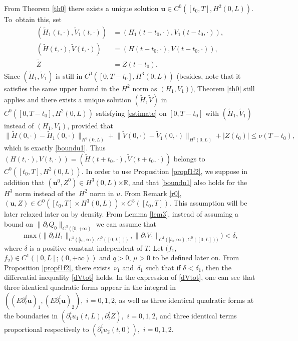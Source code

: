 \documentclass[JEP,XML,SOM,Unicode]{cedram}
\theoremstyle{definition}
\begin{document}
From Theorem \ref{th0} there exists a unique solution $\boldsymbol{u}\in C^{0}([{t_{0}},T],H^{2}(0,L))$.
To~obtain this, set
\begin{align*}
(\widetilde{H}_{1}(t,\cdot), \widetilde{V}_{1}(t,\cdot)) &= (H_{1}(t-t_{0},\cdot), V_{1}(t-t_{0},\cdot)), \\
(\widetilde{H}(t,\cdot), \widetilde{V}(t,\cdot)) &= (H(t-t_{0},\cdot), V(t-t_{0},\cdot)),\\
\widetilde{Z} &= Z(t-t_{0}). 
\end{align*}
Since $(\widetilde{H}_{1}, \widetilde{V}_{1})$ is still in $C^{0}([0,T-t_{0}], H^{3}(0,L))$ (besides, note that it satisfies the same upper bound in the $H^{2}$ norm as $(H_{1}, V_{1})$), Theorem \ref{th0} still applies and there exists a unique solution $(\widetilde{H},\widetilde{V})$ in $C^{0}([0,T-t_{0}],H^{2}(0,L))$ satisfying \eqref{estimate} on $[0,T-t_{0}]$ with $(\widetilde{H}_{1}, \widetilde{V}_{1})$ instead of $(H_{1}, V_{1})$, provided that
\begin{equation*}
\lVert \widetilde{H}(0,\cdot)-\widetilde{H}_{1}(0,\cdot)\rVert_{H^{2}(0,L)}+\lVert \widetilde{V}(0,\cdot)-\widetilde{V}_{1}(0,\cdot)\rVert_{H^{2}(0,L)}+|Z(t_{0})|\leq \nu(T-t_{0}),
\end{equation*}
which is exactly \eqref{boundu1}. Thus $(H(t,\cdot), V(t,\cdot)) = (\widetilde{H}(t+t_{0},\cdot), \widetilde{V}(t+t_{0},\cdot))$ belongs to $C^{0}([t_{0},T],H^{2}(0,L))$.
In order to use Proposition \ref{propf1f2}, we suppose in addition that $(\boldsymbol{u}^{0},Z^{0})\in H^{3}(0,L){\times\mathbb{R}}$, and that \eqref{boundu1} also holds for the $H^{3}$ norm instead of the~$H^{2}$ norm in $u$. From Remark \ref{r0},
$(\boldsymbol{u},Z)\!\in\! C^{0}([{t_{0}},T]\times H^{3}(0,L))\times C^{3}([{t_{0}},T])$. This assumption will be later relaxed later on by density. From Lemma \ref{lem3}, instead of assuming a bound on $\|\partial_{t} Q_{0}\|_{C^{3}([0,+\infty)}$ we can assume that
\begin{equation}
\max\bigl(\lVert\partial_{t}H_{1}\rVert_{C^{1}([t_{0},\infty);{C^{0}([0,L])})},\lVert\partial_{t}V_{1}\rVert_{C^{1}([t_{0},\infty);{C^{0}([0,L])})}\bigr)<\delta,
\label{boundHV}
\end{equation}
where $\delta$ is a positive constant {independent of $T$}. Let $(f_{1}$, $f_{2})\in C^{1}([0,L];(0,+\infty))$ and $q>0$, $\mu>0$ to be defined later on. From Proposition \ref{propf1f2}, there exists~$\nu_{1}$ and~$\delta_{1}$ such that if $\delta<\delta_{1}$, then the differential inequality \eqref{dVtot} holds.
In the expression of \eqref{dVtot}, one can see that three identical quadratic forms appear in the integral in $((E\partial_{t}^{i}\boldsymbol{u})_{1},(E\partial_{t}^{i}\boldsymbol{u})_{2}),$ $i=0,1,2$, as well as three identical quadratic forms at the boundaries in $(\partial_{t}^{i}u_{1}(t,L),\partial_{t}^{i}Z),$ $i=0,1,2$, and three identical terms proportional respec\-tively to $(\partial_{t}^{i}u_{2}(t,0)),$ $i=0,1,2$.
\end{document}

